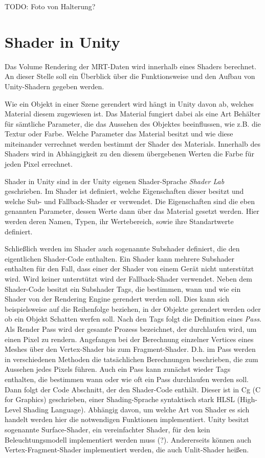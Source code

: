 TODO:
Foto von Halterung?


\section{Shader in Unity}

Das Volume Rendering der MRT-Daten wird innerhalb eines Shaders berechnet. An dieser Stelle soll ein Überblick über die Funktionsweise und den Aufbau von Unity-Shadern gegeben werden. 

Wie ein Objekt in einer Szene gerendert wird hängt in Unity davon ab, welches Material diesem zugewiesen ist. Das Material fungiert dabei als eine Art Behälter für sämtliche Parameter, die das Aussehen des Objektes beeinflussen, wie z.B. die Textur oder Farbe. Welche Parameter das Material besitzt und wie diese miteinander verrechnet werden bestimmt der Shader des Materials. Innerhalb des Shaders wird in Abhängigkeit zu den diesem übergebenen Werten die Farbe für jeden Pixel errechnet. 

Shader in Unity sind in der Unity eigenen Shader-Sprache \textit{Shader Lab} geschrieben. Im Shader ist definiert, welche Eigenschaften dieser besitzt und welche Sub- und Fallback-Shader er verwendet.
Die Eigenschaften sind die eben genannten Parameter, dessen Werte dann über das Material gesetzt werden. Hier werden deren Namen, Typen, ihr Wertebereich, sowie ihre Standartwerte definiert. 

Schließlich werden im Shader auch sogenannte Subshader definiert, die den eigentlichen Shader-Code enthalten.
Ein Shader kann mehrere Subshader enthalten für den Fall, dass einer der Shader von einem Gerät nicht unterstützt wird. Wird keiner unterstützt wird der Fallback-Shader verwendet. 
Neben dem Shader-Code besitzt ein Subshader Tags, die bestimmen, wann und wie ein Shader von der Rendering Engine gerendert werden soll. Dies kann sich beispielsweise auf die Reihenfolge beziehen, in der Objekte gerendert werden oder ob ein Objekt Schatten werfen soll. 
Nach den Tags folgt die Definition eines \textit{Pass}. Als Render Pass wird der gesamte Prozess bezeichnet, der durchlaufen wird, um einen Pixel zu rendern. Angefangen bei der Berechnung einzelner Vertices eines Meshes über den Vertex-Shader bis zum Fragment-Shader. D.h. im Pass werden in verschiedenen Methoden die tatsächlichen Berechnungen beschrieben, die zum Aussehen jedes Pixels führen. 
Auch ein Pass kann zunächst wieder Tags enthalten, die bestimmen wann oder wie oft ein Pass durchlaufen werden soll. 
Dann folgt der Code Abschnitt, der den Shader-Code enthält. Dieser ist in Cg (C for Graphics) geschrieben, einer Shading-Sprache syntaktisch stark HLSL (High-Level Shading Language). 
Abhängig davon, um welche Art von Shader es sich handelt werden hier die notwendigen Funktionen implementiert. Unity besitzt sogenannte Surface-Shader, ein vereinfachter Shader, für den kein Beleuchtungsmodell implementiert werden muss (?). Andererseits können auch Vertex-Fragment-Shader implementiert werden, die auch Unlit-Shader heißen. 

